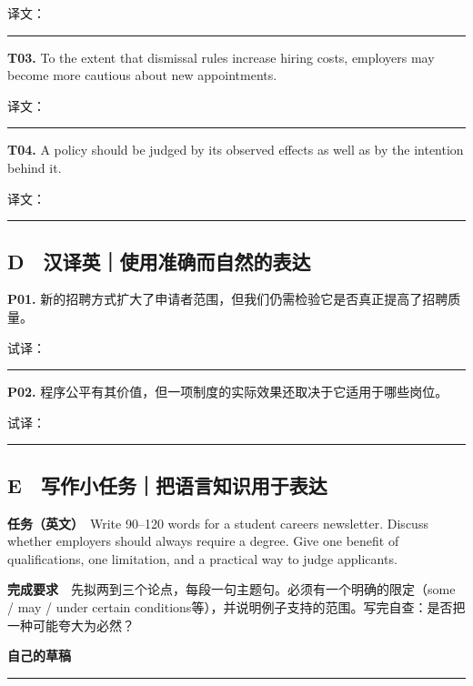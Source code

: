 \documentclass[
  11pt,
]{ctexart}
\begin{document}
译文：

\rule{0.8\linewidth}{0.35pt}

\textbf{T03.} To the extent that dismissal rules increase hiring costs,
employers may become more cautious about new appointments.

译文：

\rule{0.8\linewidth}{0.35pt}

\textbf{T04.} A policy should be judged by its observed effects as well
as by the intention behind it.

译文：

\rule{0.8\linewidth}{0.35pt}

\subsection{D　汉译英｜使用准确而自然的表达}\label{d-ux6c49ux8bd1ux82f1ux4f7fux7528ux51c6ux786eux800cux81eaux7136ux7684ux8868ux8fbe}

\textbf{P01.}
新的招聘方式扩大了申请者范围，但我们仍需检验它是否真正提高了招聘质量。

试译：

\rule{0.8\linewidth}{0.35pt}

\textbf{P02.}
程序公平有其价值，但一项制度的实际效果还取决于它适用于哪些岗位。

试译：

\rule{0.8\linewidth}{0.35pt}

\subsection{E　写作小任务｜把语言知识用于表达}\label{e-ux5199ux4f5cux5c0fux4efbux52a1ux628aux8bedux8a00ux77e5ux8bc6ux7528ux4e8eux8868ux8fbe}

\textbf{任务（英文）}　Write 90--120 words for a student careers
newsletter. Discuss whether employers should always require a degree.
Give one benefit of qualifications, one limitation, and a practical way
to judge applicants.

\textbf{完成要求}　先拟两到三个论点，每段一句主题句。必须有一个明确的限定（some
/ may / under certain
conditions等），并说明例子支持的范围。写完自查：是否把一种可能夸大为必然？

\textbf{自己的草稿}

\vspace{2cm}\rule{0.95\linewidth}{0.35pt}\vspace{0.6cm}

\clearpage
\end{document}
